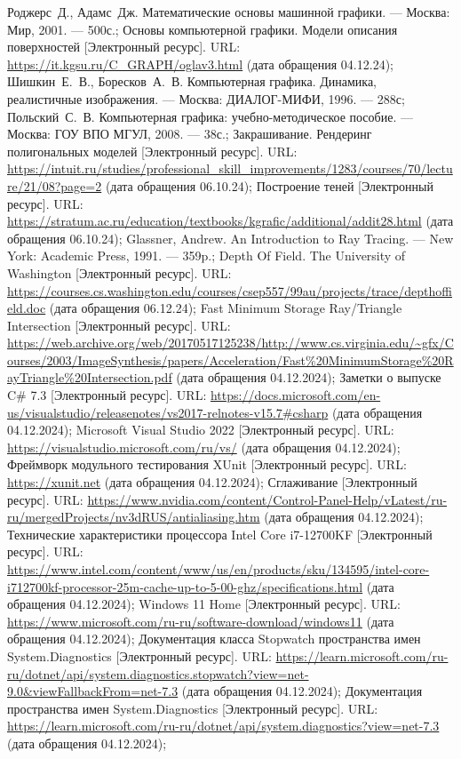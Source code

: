 \begin{thebibliography}{}
	 Роджерс~Д., Адамс~Дж. Математические основы машинной графики. --- Москва: Мир, 2001. --- 500с.;
	 Основы компьютерной графики. Модели описания поверхностей [Электронный ресурс]. URL: \url{https://it.kgsu.ru/C_GRAPH/oglav3.html} (дата обращения 04.12.24);
	 Шишкин~Е.~В., Боресков~А.~В. Компьютерная графика. Динамика, реалистичные изображения. --- Москва: ДИАЛОГ-МИФИ, 1996. --- 288с;
	 Польский~С.~В. Компьютерная графика: учебно-методическое пособие. --- Москва: ГОУ ВПО МГУЛ, 2008. --- 38с.;
	 Закрашивание. Рендеринг полигональных моделей [Электронный ресурс]. URL: \url{https://intuit.ru/studies/professional\_skill\_improvements/1283/courses/70/lecture/21/08?page=2} (дата обращения 06.10.24);
	 Построение теней [Электронный ресурс]. URL: \url{https://stratum.ac.ru/education/textbooks/kgrafic/additional/addit28.html} (дата обращения 06.10.24);
	 Glassner, Andrew. An Introduction to Ray Tracing. --- New York: Academic Press, 1991. --- 359p.;
	 Depth Of Field. The University of Washington [Электронный ресурс]. URL: \url{https://courses.cs.washington.edu/courses/csep557/99au/projects/trace/depthoffield.doc} (дата обращения 06.12.24);
	 Fast Minimum Storage Ray/Triangle Intersection [Электронный ресурс]. URL: \url{https://web.archive.org/web/20170517125238/http://www.cs.virginia.edu/~gfx/Courses/2003/ImageSynthesis/papers/Acceleration/Fast\%20MinimumStorage\%20RayTriangle\%20Intersection.pdf} (дата обращения 04.12.2024);
	 Заметки о выпуске C\# 7.3 [Электронный ресурс]. URL: \url{https://docs.microsoft.com/en-us/visualstudio/releasenotes/vs2017-relnotes-v15.7#csharp} (дата обращения 04.12.2024);
	 Microsoft Visual Studio 2022 [Электронный ресурс]. URL: \url{https://visualstudio.microsoft.com/ru/vs/} (дата обращения 04.12.2024);
	 Фреймворк модульного тестирования XUnit [Электронный ресурс]. URL: \url{https://xunit.net} (дата обращения 04.12.2024);
	 Сглаживание [Электронный ресурс]. URL: \url{https://www.nvidia.com/content/Control-Panel-Help/vLatest/ru-ru/mergedProjects/nv3dRUS/antialiasing.htm} (дата обращения 04.12.2024);
	 Технические характеристики процессора Intel Core i7-12700KF [Электронный ресурс]. URL: \url{https://www.intel.com/content/www/us/en/products/sku/134595/intel-core-i712700kf-processor-25m-cache-up-to-5-00-ghz/specifications.html} (дата обращения 04.12.2024);
	 Windows 11 Home [Электронный ресурс]. URL: \url{https://www.microsoft.com/ru-ru/software-download/windows11} (дата обращения 04.12.2024);
	 Документация класса Stopwatch пространства имен System.Diagnostics [Электронный ресурс]. URL: \url{https://learn.microsoft.com/ru-ru/dotnet/api/system.diagnostics.stopwatch?view=net-9.0&viewFallbackFrom=net-7.3} (дата обращения 04.12.2024);
	 Документация пространства имен System.Diagnostics [Электронный ресурс]. URL: \url{https://learn.microsoft.com/ru-ru/dotnet/api/system.diagnostics?view=net-7.3} (дата обращения 04.12.2024);
\end{thebibliography}
